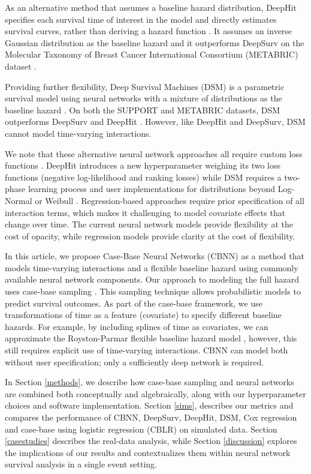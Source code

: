 \documentclass[AMA,STIX1COL,]{WileyNJD-v2}
\begin{document}
As an alternative method that assumes a baseline hazard distribution,
DeepHit specifies each survival time of interest in the model and
directly estimates survival curves, rather than deriving a hazard
function \citep{lee2018DeepHit}. It assumes an inverse Gaussian
distribution as the baseline hazard and it outperforms DeepSurv on the
Molecular Taxonomy of Breast Cancer International Consortium (METABRIC)
dataset \citep{curtis2012genomic}.

Providing further flexibility, Deep Survival Machines (DSM) is a
parametric survival model using neural networks with a mixture of
distributions as the baseline hazard \citep{dsmPaper}. On both the
SUPPORT and METABRIC datasets, DSM outperforms DeepSurv and DeepHit
\citep{dsmPaper}. However, like DeepHit and DeepSurv, DSM cannot model
time-varying interactions.

We note that these alternative neural network approaches all require
custom loss functions \citep{katzman2018DeepSurv} \citep{lee2018DeepHit}
\citep{dsmPaper}. DeepHit introduces a new hyperparameter weighing its
two loss functions (negative log-likelihood and ranking losses) while
DSM requires a two-phase learning process and user implementations for
distributions beyond Log-Normal or Weibull \citep{lee2018DeepHit}
\citep{dsmPaper}. Regression-based approaches require prior
specification of all interaction terms, which makes it challenging to
model covariate effects that change over time. The current neural
network models provide flexibility at the cost of opacity, while
regression models provide clarity at the cost of flexibility.

In this article, we propose Case-Base Neural Networks (CBNN) as a method
that models time-varying interactions and a flexible baseline hazard
using commonly available neural network components. Our approach to
modeling the full hazard uses case-base sampling \citep{hanley2009}.
This sampling technique allows probabilistic models to predict survival
outcomes. As part of the case-base framework, we use transformations of
time as a feature (covariate) to specify different baseline hazards. For
example, by including splines of time as covariates, we can approximate
the Royston-Parmar flexible baseline hazard model
\citep{royston2002flexible}, however, this still requires explicit use
of time-varying interactions. CBNN can model both without user
specification; only a sufficiently deep network is required.

In Section \ref{methods}, we describe how case-base sampling and neural
networks are combined both conceptually and algebraically, along with
our hyperparameter choices and software implementation. Section
\ref{sims}, describes our metrics and compares the performance of CBNN,
DeepSurv, DeepHit, DSM, Cox regression and case-base using logistic
regression (CBLR) on simulated data. Section \ref{casestudies} describes
the real-data analysis, while Section \ref{discussion} explores the
implications of our results and contextualizes them within neural
network survival analysis in a single event setting.
\end{document}
